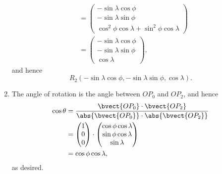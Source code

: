 \begin{enumerate}
\begin{align*}
                             & = \begin{pmatrix}
                                     - \sin \lambda \cos \phi  \\
                                     -  \sin \lambda \sin \phi \\
                                     \cos^2 \phi \cos \lambda  + \sin^2 \phi \cos \lambda
                                 \end{pmatrix}                                                        \\
                             & = \begin{pmatrix}
                                     - \sin \lambda \cos \phi  \\
                                     -  \sin \lambda \sin \phi \\
                                     \cos \lambda
                                 \end{pmatrix},
          \end{align*}
          and hence
          \[
              R_2 (- \sin \lambda \cos \phi, - \sin \lambda \sin \phi, \cos \lambda).
          \]

    \item The angle of rotation is the angle between \(O P_0\) and \(O P_2\), and hence
          \begin{align*}
              \cos \theta & = \frac{\bvect{O P_0} \cdot \bvect{O P_2}}{\abs{\bvect{O P_0}} \cdot \abs{\bvect{O P_2}}} \\
                          & = \begin{pmatrix}
                                  1 \\
                                  0 \\
                                  0
                              \end{pmatrix} \cdot \begin{pmatrix}
                                                      \cos \phi \cos \lambda \\
                                                      \sin \phi \cos \lambda \\
                                                      \sin \lambda
                                                  \end{pmatrix}                                              \\
                          & = \cos \phi \cos \lambda,
          \end{align*}
          as desired.


\end{enumerate}
